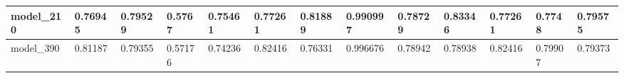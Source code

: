 \begin{tabular}{|l|l|l|l|l|l|l|l|l|l|l|l|l|}
model\_210     & 0.76945     & 0.79529        & 0.5767       & 0.75461          & 0.77261              & 0.81889              & 0.990997     & 0.78729           & 0.83346            & 0.77261         & 0.7748      & 0.79575      \\ \hline
model\_390     & 0.81187     & 0.79355        & 0.57176      & 0.74236          & 0.82416              & 0.76331              & 0.996676     & 0.78942           & 0.78938            & 0.82416         & 0.79907     & 0.79373      \\ \hline
\end{tabular}